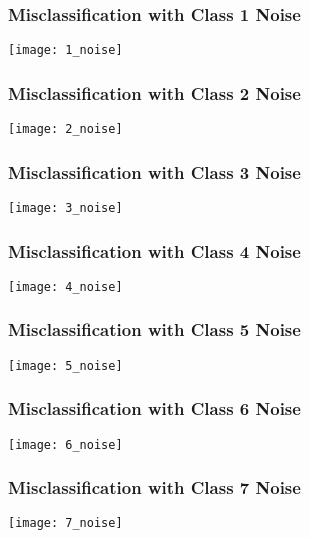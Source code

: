 \documentclass[a4paper]{article}
\begin{document}
\subsubsection{Misclassification with Class 1 Noise}
\begin{center}
\texttt{[image: 1\_noise]}
\end{center}

\subsubsection{Misclassification with Class 2 Noise}
\begin{center}
\texttt{[image: 2\_noise]}
\end{center}

\subsubsection{Misclassification with Class 3 Noise}
\begin{center}
\texttt{[image: 3\_noise]}
\end{center}

\subsubsection{Misclassification with Class 4 Noise}
\begin{center}
\texttt{[image: 4\_noise]}
\end{center}

\subsubsection{Misclassification with Class 5 Noise}
\begin{center}
\texttt{[image: 5\_noise]}
\end{center}

\subsubsection{Misclassification with Class 6 Noise}
\begin{center}
\texttt{[image: 6\_noise]}
\end{center}

\subsubsection{Misclassification with Class 7 Noise}
\begin{center}
\texttt{[image: 7\_noise]}
\end{center}
\end{document}
